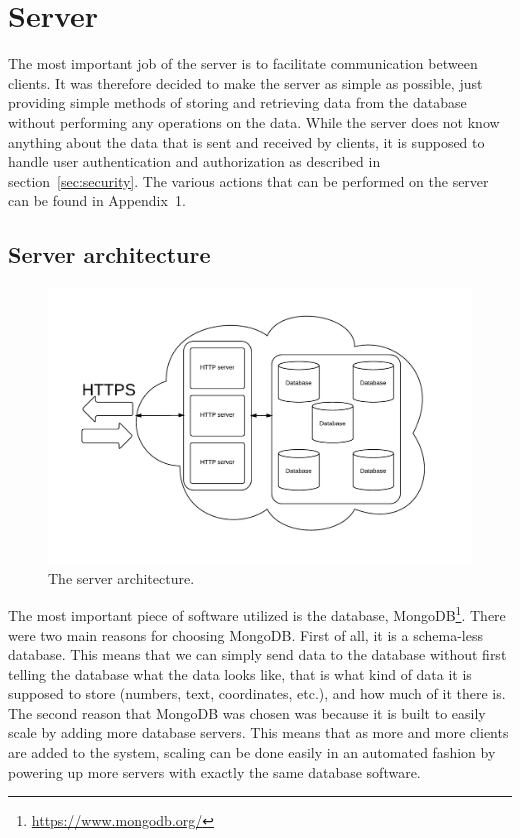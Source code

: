 \section{Server}
The most important job of the server is to facilitate communication between clients.
It was therefore decided to make the server as simple as possible, just providing simple methods of storing and retrieving data from the database without performing any operations on the data.
While the server does not know anything about the data that is sent and received by clients, it is supposed to handle user authentication and authorization as described in section~\ref{sec:security}.
The various actions that can be performed on the server can be found in Appendix~1.

\subsection{Server architecture}
\begin{figure}[H]
\begin{center}
	\includegraphics[scale=0.75]{graphics/server.pdf}
	\caption{The server architecture.}
	\label{fig:server-architecture}
\end{center}
\end{figure}
The most important piece of software utilized is the database, MongoDB\footnote{\url{https://www.mongodb.org/}}.
There were two main reasons for choosing MongoDB.
First of all, it is a schema-less database.
This means that we can simply send data to the database without first telling the database what the data looks like, that is what kind of data it is supposed to store (numbers, text, coordinates, etc.), and how much of it there is.
The second reason that MongoDB was chosen was because it is built to easily scale by adding more database servers.
This means that as more and more clients are added to the system, scaling can be done easily in an automated fashion by powering up more servers with exactly the same database software.

